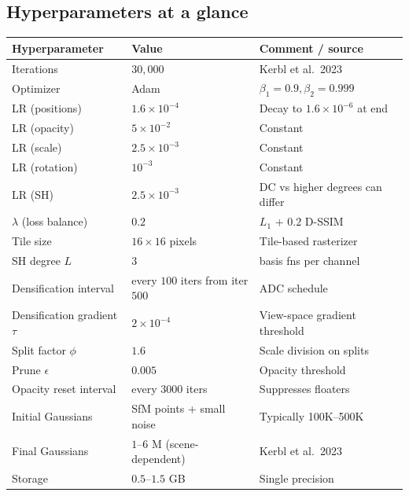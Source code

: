 \subsection{Hyperparameters at a glance}\label{hyperparameters-at-a-glance}

{\def\LTcaptype{none} %
\begin{longtable}[]{@{}
  >{\raggedright\arraybackslash}p{}
  >{\raggedright\arraybackslash}p{}
  >{\raggedright\arraybackslash}p{}@{}}
\toprule\noalign{}
\begin{minipage}[b]{\linewidth}\raggedright
\textbf{Hyperparameter}
\end{minipage} & \begin{minipage}[b]{\linewidth}\raggedright
\textbf{Value}
\end{minipage} & \begin{minipage}[b]{\linewidth}\raggedright
\textbf{Comment / source}
\end{minipage} \\
\midrule\noalign{}
\endhead
\bottomrule\noalign{}
\endlastfoot
Iterations & \(30{,}000\) & Kerbl et al.~2023 \\
Optimizer & Adam & \(\beta_1=0.9,\beta_2=0.999\) \\
LR (positions) & \(1.6\times 10^{-4}\) & Decay to \(1.6\times 10^{-6}\) at end \\
LR (opacity) & \(5\times 10^{-2}\) & Constant \\
LR (scale) & \(2.5\times 10^{-3}\) & Constant \\
LR (rotation) & \(10^{-3}\) & Constant \\
LR (SH) & \(2.5\times 10^{-3}\) & DC vs higher degrees can differ \\
\(\lambda\) (loss balance) & \(0.2\) & \(L_1\) + \(0.2\) D-SSIM \\
Tile size & \(16\times16\) pixels & Tile-based rasterizer \\
SH degree \(L\) & \(3\) & 16 basis fns per channel \\
Densification interval & every \(100\) iters from iter \(500\) & ADC schedule \\
Densification gradient \(\tau\) & \(2\times 10^{-4}\) & View-space gradient threshold \\
Split factor \(\phi\) & \(1.6\) & Scale division on splits \\
Prune \(\epsilon\) & \(0.005\) & Opacity threshold \\
Opacity reset interval & every \(3000\) iters & Suppresses floaters \\
Initial Gaussians & SfM points + small noise & Typically 100K--500K \\
Final Gaussians & \(1\)--\(6\) M (scene-dependent) & Kerbl et al.~2023 \\
Storage & \(0.5\)--\(1.5\) GB & Single precision \\
\end{longtable}
}


